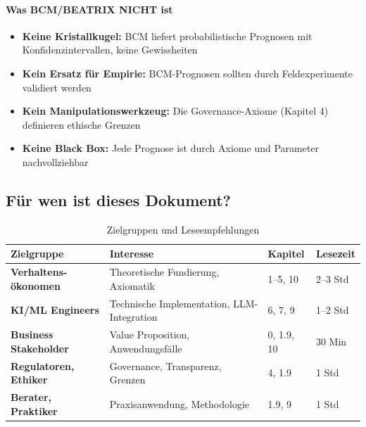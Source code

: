 \paragraph{Was BCM/BEATRIX NICHT ist}

\begin{itemize}
    \item \textbf{Keine Kristallkugel:} BCM liefert probabilistische Prognosen mit Konfidenzintervallen, keine Gewissheiten
    \item \textbf{Kein Ersatz für Empirie:} BCM-Prognosen sollten durch Feldexperimente validiert werden
    \item \textbf{Kein Manipulationswerkzeug:} Die Governance-Axiome (Kapitel 4) definieren ethische Grenzen
    \item \textbf{Keine Black Box:} Jede Prognose ist durch Axiome und Parameter nachvollziehbar
\end{itemize}

\subsection*{Für wen ist dieses Dokument?}

\begin{table}[h]
\centering
\caption{Zielgruppen und Leseempfehlungen}
\begin{tabular}{@{}p{3.5cm}p{5cm}p{3cm}p{2cm}@{}}
\toprule
\textbf{Zielgruppe} & \textbf{Interesse} & \textbf{Kapitel} & \textbf{Lesezeit} \\
\midrule
\textbf{Verhaltens-ökonomen} & Theoretische Fundierung, Axiomatik & 1--5, 10 & 2--3 Std \\
\textbf{KI/ML Engineers} & Technische Implementation, LLM-Integration & 6, 7, 9 & 1--2 Std \\
\textbf{Business Stakeholder} & Value Proposition, Anwendungsfälle & 0, 1.9, 10 & 30 Min \\
\textbf{Regulatoren, Ethiker} & Governance, Transparenz, Grenzen & 4, 1.9 & 1 Std \\
\textbf{Berater, Praktiker} & Praxisanwendung, Methodologie & 1.9, 9 & 1 Std \\
\bottomrule
\end{tabular}
\end{table}

